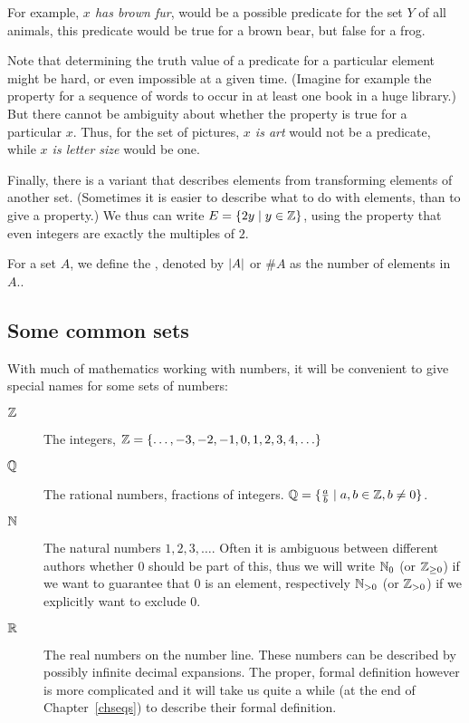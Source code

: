 For example, {\em $x$ has brown fur}, would be a possible predicate for the
set $Y$ of all animals, this predicate would be true for a brown bear, but
false for a frog.

Note that
determining the truth value of a predicate for a particular element
might be hard, or even impossible at a given time. (Imagine for example the
property for a sequence of words to occur in at least one book in a huge
library.)
But there cannot be ambiguity about whether the property is true for a
particular $x$. Thus, for
the set of pictures, {\em $x$ is art} would not be a predicate, while
{\em $x$ is letter size} would be one.
\smallskip

Finally, there is a variant that describes elements from transforming
elements of another set. (Sometimes
it is easier to describe what to do with elements, than to
give a property.)
We thus can write
$E=\{2y\mid y\in{\mathbb Z}\}$, using the property that even integers are exactly the
multiples of $2$.
\smallskip

For a set $A$, we define the , denoted by $\left|A\right|$ or
$\# A$ as the number of elements in $A$..

\subsection{Some common sets}

With much of mathematics working with numbers, it will be convenient to give
special names for some sets of numbers:
\begin{description}
\item[${\mathbb Z}$] The integers, ${\mathbb Z}=\{\ldots,-3,-2,-1,0,1,2,3,4,\ldots\}$
\item[${\mathbb Q}$] The rational numbers, fractions of integers.
${\mathbb Q}=\{\frac{a}{b}\mid a,b\in{\mathbb Z}, b\not=0\}$.
\item[${\mathbb N}$] The natural numbers $1,2,3,\ldots$. Often it is ambiguous
between different authors whether $0$ should be part of this, thus we will
write ${\mathbb N}_0$ (or ${\mathbb Z}_{\ge 0}$) if we want to guarantee that $0$ is an
element, respectively ${\mathbb N}_{>0}$ (or ${\mathbb Z}_{>0}$) if we explicitly want to
exclude $0$.
\item[${\mathbb R}$] The real numbers on the number line. These numbers can be
described by possibly infinite decimal expansions. The proper, formal
definition however is more complicated and it will take us quite
a while (at the end of Chapter~\ref{chseqs}) to describe their formal
definition.
\end{description}


